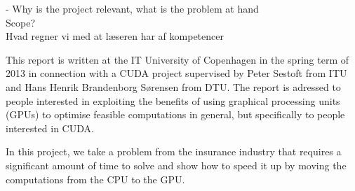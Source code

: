 	- Why is the project relevant, what is the problem at hand \\
	Scope? \cite{pmpp} \\
	Hvad regner vi med at læseren har af kompetencer

	This report is written at the IT University of Copenhagen in the spring term of 2013 in connection with a CUDA project supervised by Peter Sestoft from ITU and Hans Henrik Brandenborg Sørensen from DTU. The report is adressed to people interested in exploiting the benefits of using graphical processing units (GPUs) to optimise feasible computations in general, but specifically to people interested in CUDA.

	In this project, we take a problem from the insurance industry that requires a significant amount of time to solve and show how to speed it up by moving the computations from the CPU to the GPU.
